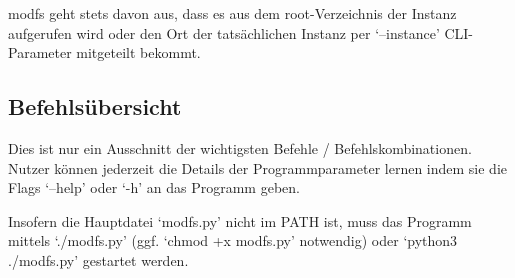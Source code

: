 \documentclass[a4paper,numbers=withenddot,11pt]{scrartcl}
\begin{document}
modfs geht stets davon aus, dass es aus dem root-Verzeichnis der Instanz
aufgerufen wird oder den Ort der tatsächlichen Instanz per `--instance'
CLI-Parameter mitgeteilt bekommt.

\subsection{Befehlsübersicht}

Dies ist nur ein Ausschnitt der wichtigsten Befehle / Befehlskombinationen.
Nutzer können jederzeit die Details der Programmparameter lernen indem sie
die Flags `--help' oder `-h' an das Programm geben.

Insofern die Hauptdatei `modfs.py' nicht im PATH ist, muss das Programm
mittels `./modfs.py' (ggf. `chmod +x modfs.py' notwendig) oder
`python3 ./modfs.py' gestartet werden.
\end{document}
